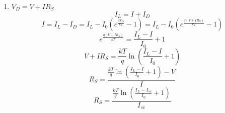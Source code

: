 \documentclass[fleqn]{article}
\begin{document}
\begin{enumerate}
\item \quad \quad \quad $V_D = V + I R_S $
  \begin{equation*}
    I_L = I + I_D
  \end{equation*}
  \begin{equation*}
    I = I_L - I_D = I_L - I_0 \left(e^{\frac{qV_D}{kT}}-1\right) = I_L - I_0 \left(e^{\frac{q\left(V + I R_S\right)}{kT}}-1\right)
  \end{equation*}
  \begin{equation*}
    e^{\frac{q\left(V + I R_S\right)}{kT}} = \frac{I_L - I}{I_0} + 1
  \end{equation*}
  \begin{equation*}
    V + I R_S = \frac{kT}{q}\ln \left(\frac{I_L - I}{I_0} + 1\right)
  \end{equation*}
  \begin{equation*}
    R_S = \frac{\frac{kT}{q}\ln \left(\frac{I_L - I}{I_0} + 1\right) - V}{I}
  \end{equation*}
  \begin{equation*}
    R_S = \frac{\frac{kT}{q}\ln \left(\frac{I_L - I_{sc}}{I_0} + 1\right)}{I_{sc}}
  \end{equation*}


\end{enumerate}
\end{document}
